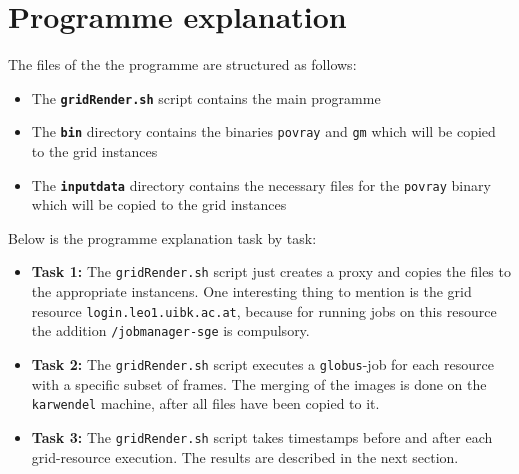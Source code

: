 \documentclass{article}
\begin{document}


\section{Programme explanation}
The files of the the programme are structured as follows:

\begin{itemize}
\item The \texttt{\textbf{gridRender.sh}} script contains the main programme
\item The \texttt{\textbf{bin}} directory contains the binaries \texttt{povray} and \texttt{gm} which will be copied to the grid instances
\item The \texttt{\textbf{inputdata}} directory contains the necessary files for the \texttt{povray} binary which will be copied to the grid instances
\end{itemize}

Below is the programme explanation task by task:

\begin{itemize}

\item \textbf{Task 1:} The \texttt{gridRender.sh} script just creates a proxy and copies the files to the appropriate instancens. One interesting thing to mention is the grid resource \texttt{login.leo1.uibk.ac.at}, because for running jobs on this resource the addition \texttt{/jobmanager-sge} is compulsory.
\item \textbf{Task 2:} The \texttt{gridRender.sh} script executes a \texttt{globus}-job for each resource with a specific subset of frames. The merging of the images is done on the \texttt{karwendel} machine, after all files have been copied to it.
\item \textbf{Task 3:} The \texttt{gridRender.sh} script takes timestamps before and after each grid-resource execution. The results are described in the next section.

\end{itemize}
\end{document}
